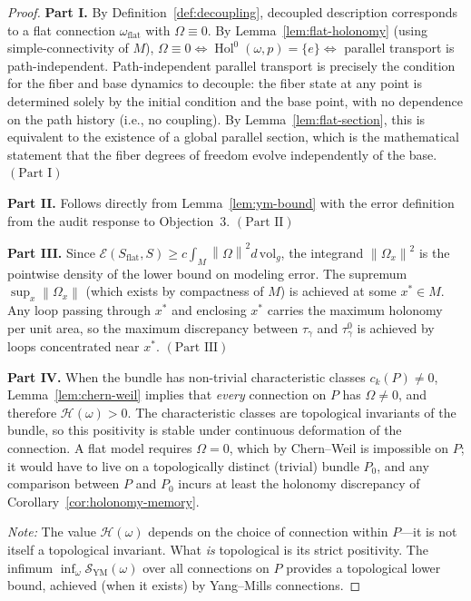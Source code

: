 \documentclass[12pt]{amsart}
\theoremstyle{plain}
\theoremstyle{definition}
\DeclareMathOperator{\Hol}{Hol}
\newcommand{\norm}[1]{\left\lVert #1 \right\rVert}
\newcommand{\dVol}{d\,\mathrm{vol}_g}
\begin{document}
\begin{proof}
\textbf{Part I.} By Definition~\ref{def:decoupling}, decoupled description
corresponds to a flat connection $\omega_{\mathrm{flat}}$ with $\Omega
\equiv 0$. By Lemma~\ref{lem:flat-holonomy} (using simple-connectivity of
$M$), $\Omega \equiv 0 \iff \Hol^0(\omega,p) = \{e\} \iff$ parallel
transport is path-independent. Path-independent parallel transport is
precisely the condition for the fiber and base dynamics to decouple:
the fiber state at any point is determined solely by the initial condition
and the base point, with no dependence on the path history
(i.e., no coupling). By Lemma~\ref{lem:flat-section}, this is equivalent to
the existence of a global parallel section, which is the mathematical
statement that the fiber degrees of freedom evolve independently of the
base. \hfill$(\text{Part I})$

\smallskip
\textbf{Part II.} Follows directly from Lemma~\ref{lem:ym-bound} with the
error definition from the audit response to Objection~3.
\hfill$(\text{Part II})$

\smallskip
\textbf{Part III.} Since $\mathcal{E}(S_{\mathrm{flat}},S) \geq c \int_M
\norm{\Omega}^2 \dVol$, the integrand $\norm{\Omega_x}^2$ is the pointwise
density of the lower bound on modeling error. The supremum
$\sup_x \norm{\Omega_x}$ (which exists by compactness of $M$) is achieved at
some $x^* \in M$. Any loop passing through $x^*$ and enclosing $x^*$ carries
the maximum holonomy per unit area, so the maximum discrepancy between
$\tau_\gamma$ and $\tau^0_\gamma$ is achieved by loops concentrated near
$x^*$. \hfill$(\text{Part III})$

\smallskip
\textbf{Part IV.} When the bundle has non-trivial characteristic classes
$c_k(P) \neq 0$, Lemma~\ref{lem:chern-weil} implies that \emph{every}
connection on $P$ has $\Omega \neq 0$, and therefore
$\mathcal{H}(\omega) > 0$. The characteristic classes are topological
invariants of the bundle, so this positivity is stable under continuous
deformation of the connection. A flat model requires $\Omega = 0$,
which by Chern--Weil is impossible on $P$; it would have to live on a
topologically distinct (trivial) bundle $P_0$, and any comparison
between $P$ and $P_0$ incurs at least the holonomy discrepancy of
Corollary~\ref{cor:holonomy-memory}.

\emph{Note:} The value $\mathcal{H}(\omega)$ depends on the choice of
connection within $P$---it is not itself a topological invariant. What
\emph{is} topological is its strict positivity. The infimum
$\inf_\omega \mathcal{S}_{\mathrm{YM}}(\omega)$ over all connections
on $P$ provides a topological lower bound, achieved (when it exists) by
Yang--Mills connections.
\end{proof}
\end{document}
